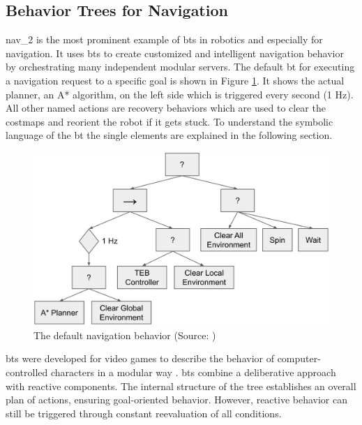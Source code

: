 \subsection{Behavior Trees for Navigation}

\gls{nav_2} is the most prominent example of \glspl{bt} in robotics and especially for navigation. It uses \glspl{bt} to create customized and intelligent navigation behavior by orchestrating many independent modular servers. The default \gls{bt} for executing a navigation request to a specific goal is shown in Figure \ref{fig:nav2_bt}. It shows the actual planner, an A* algorithm, on the left side which is triggered every second (1 Hz). All other named actions are recovery behaviors which are used to clear the costmaps and reorient the robot if it gets stuck. To understand the symbolic language of the \gls{bt} the single elements are explained in the following section.

\begin{figure}[h]
    \centering
    \includegraphics[width=\textwidth]{figures/02_state_of_the_art/nav2_bt.png}
    \caption[The default navigation behavior]{The default navigation behavior (Source: \cite{macenski_marathon_2020})}
    \label{fig:nav2_bt}
\end{figure}

\Glspl{bt} were developed for video games to describe the behavior of computer-controlled characters in a modular way \cite{hutchison_evolving_2010}. \Glspl{bt} combine a deliberative approach with reactive components. The internal structure of the tree establishes an overall plan of actions, ensuring goal-oriented behavior. However, reactive behavior can still be triggered through constant reevaluation of all conditions. 

